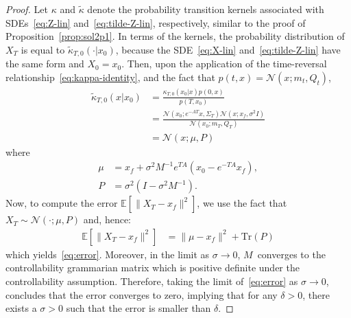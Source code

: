 \documentclass[10pt,a4paper]{amsart}
\newcommand{\trace}{\text{Tr}}
\begin{document}
\begin{proof}
     Let $\kappa$ and $\tilde \kappa$ denote the probability transition kernels associated with SDEs~\eqref{eq:Z-lin} and~\eqref{eq:tilde-Z-lin}, respectively, similar to the proof of Proposition~\ref{prop:sol2p1}. In terms of the kernels, the probability distribution of $X_T$ is equal to $\tilde \kappa_{T,0}(\cdot|x_0)$, because the SDE~\eqref{eq:X-lin} and~\eqref{eq:tilde-Z-lin} have the same form and $X_0=x_0$.  Then, upon the application of the time-reversal relationship~\eqref{eq:kappa-identity}, and the fact that $p(t,x) = \mathcal N(x;m_t,Q_t)$,
\begin{align*}
    \tilde \kappa_{T,0}(x|x_0) &=  \frac{ \kappa_{T,0}(x_0|x)p(0,x)}{p(T,x_0)} \\
    & = \frac{\mathcal N(x_0;e^{-AT}x,\Sigma_T) \mathcal N(x;x_f,\sigma^2I)}{\mathcal N(x_0;m_T,Q_T)}\\&=\mathcal N(x;\mu,P)
\end{align*}
where 
\begin{align*}
    \mu &= x_f + \sigma^2 M^{-1}e^{TA}(x_0 - e^{-TA}x_f),\\
    P & =  \sigma^2(I- \sigma^2 M^{-1}).
\end{align*}
  Now, to compute the error   $\mathbb E[\|X_T-x_f\|^2]$, we use the fact that $X_T \sim \mathcal N(\cdot;\mu, P)$ and, hence: 
\begin{align}
    \mathbb E[\|X_T-x_f\|^2] &= \|\mu-x_f\|^2 + \trace(P) \nonumber
\end{align}
which yields~\eqref{eq:error}. Moreover, in the limit as $\sigma \to 0$, $M$~converges to the controllability grammarian matrix which is positive definite  under the controllability assumption.  Therefore, taking the limit of~\eqref{eq:error} as $\sigma \to 0$, concludes that the error converges to zero, implying that for any $\delta>0$, there exists a $\sigma>0$ such that the error is smaller than $\delta$. 
\end{proof}
\end{document}
